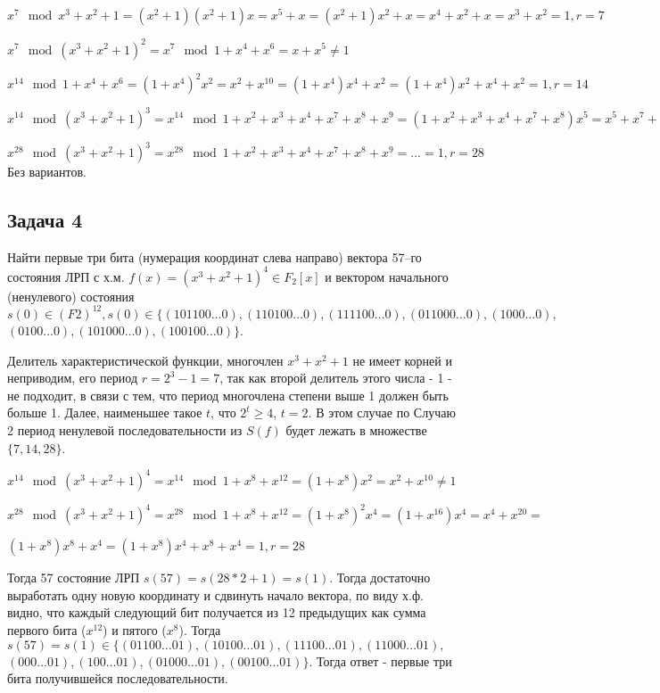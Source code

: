 \documentclass[12pt]{extarticle}
\begin{document}
\begin{enumerate}
    $x^7 \mod x^3+x^2+1 = (x^2+1)(x^2+1)x = x^5 + x = (x^2+1)x^2 +x = x^4 + x^2 + x = x^3 + x^2 = 1, r = 7$
    
    $x^7 \mod (x^3+x^2+1)^2 = x^7 \mod 1+x^4+x^6 = x+x^5 \neq 1$
    
    $x^{14} \mod 1+x^4+x^6 = (1+x^4)^2 x^2 = x^2 + x^10 = (1+x^4)x^4 + x^2 = (1+x^4)x^2 + x^4 + x^2 = 1, r = 14$
    
    $x^{14} \mod (x^3+x^2+1)^3 = x^{14} \mod 1 + x^2 + x^3 + x^4 + x^7 + x^8 + x^{9} = (1 + x^2 + x^3 + x^4 + x^7 + x^8) x^5 = x^5 + x^7 + x^8 + x^9 + x^{12} + x^{13} = 1 + x^2 + x^3 + x^4 + x^5 + (1+x) (x^3 + x^5 + x^6 + x^7 + x^10 + x^11) ... = 1+x+x^5+x^7 \neq 1$
    
    $x^{28} \mod (x^3+x^2+1)^3 = x^{28} \mod 1 + x^2 + x^3 + x^4 + x^7 + x^8 + x^{9} = ... = 1, r = 28$ Без вариантов.
    
\end{enumerate}

\subsection{Задача 4}
Найти первые три бита (нумерация координат слева направо) вектора 57–го состояния ЛРП с х.м. $f(x)=(x^3+x^2+1)^4 \in F_2[x]$ и вектором начального (ненулевого) состояния $s(0)\in (F2)^{12}, s(0)\in\{ (101100…0), (110100…0), (111100…0), (011000…0), (1000…0), $ $(0100…0), (101000…0), (100100…0)\}$.

Делитель характеристической функции, многочлен $x^3+x^2+1$ не имеет корней и неприводим, его период $r = 2^3 -1 = 7$, так как второй делитель этого числа - 1 - не подходит, в связи с тем, что период многочлена степени выше 1 должен быть больше 1. Далее, наименьшее такое $t$, что $2^t \geq 4$, $t=2$. В этом случае по Случаю 2 период ненулевой последовательности из $S(f)$ будет лежать в множестве $\{7, 14, 28\}$. 

$x^{14} \mod (x^3+x^2+1)^4 = x^{14} \mod 1 + x^8 + x^{12} = (1+x^8) x^2 = x^2 + x^10 \neq 1$

$x^{28} \mod (x^3+x^2+1)^4 = x^{28} \mod 1 + x^8 + x^{12} = (1+x^8)^2 x^4 = (1 + x^{16}) x^4 = x^4 + x^{20} =$

$(1+x^8)x^8 +x^4 = (1+x^8)x^4 + x^8 + x^4 = 1, r = 28$

Тогда 57 состояние ЛРП $s(57) = s(28*2 + 1) = s(1)$. Тогда достаточно выработать одну новую координату и сдвинуть начало вектора, по виду х.ф. видно, что каждый следующий бит получается из 12 предыдущих как сумма первого бита ($x^{12}$) и пятого ($x^8$). Тогда $s(57) = s(1) \in\{ (01100…01), (10100…01), (11100…01), (11000…01), $ $(000…01), (100…01), (01000…01), (00100…01)\}$. Тогда ответ - первые три бита получившейся последовательности.
\end{document}
